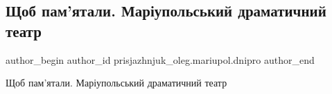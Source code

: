  
 
 
 
 

\subsection{Щоб пам'ятали. Маріупольський драматичний театр}
\label{sec:22_12_2022.fb.prisjazhnjuk_oleg.mariupol.dnipro.1.shchob_pam_yatali__m}

\ifcmt
 author_begin
   author_id prisjazhnjuk_oleg.mariupol.dnipro
 author_end
\fi

Щоб пам'ятали. Маріупольський драматичний театр

